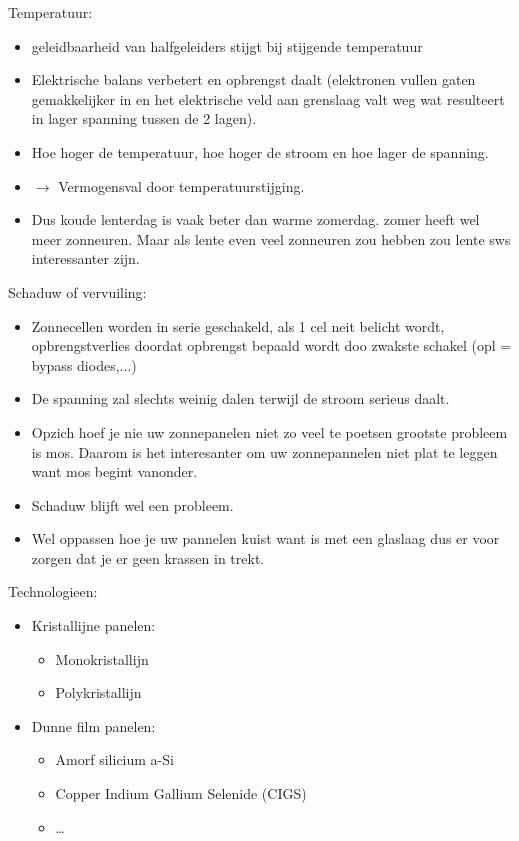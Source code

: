 \documentclass[12pt]{article}
\begin{document}
Temperatuur:\begin{itemize}
    \item geleidbaarheid van halfgeleiders stijgt bij stijgende temperatuur 
    \item Elektrische balans verbetert en opbrengst daalt (elektronen vullen gaten gemakkelijker in en het elektrische veld aan grenslaag valt weg wat resulteert in lager spanning tussen de 2 lagen).
    \item Hoe hoger de temperatuur, hoe hoger de stroom en hoe lager de spanning.
    \item $\rightarrow$ Vermogensval door temperatuurstijging.
    \item Dus koude lenterdag is vaak beter dan warme zomerdag. zomer heeft wel meer zonneuren. Maar als lente even veel zonneuren zou hebben zou lente sws interessanter zijn.
\end{itemize}
Schaduw of vervuiling:\begin{itemize}
    \item Zonnecellen worden in serie geschakeld, als 1 cel neit belicht wordt, opbrengstverlies doordat opbrengst bepaald wordt doo zwakste schakel (opl = bypass diodes,...)
    \item De spanning zal slechts weinig dalen terwijl de stroom serieus daalt.
    \item Opzich hoef je nie uw zonnepanelen niet zo veel te poetsen grootste probleem is mos. Daarom is het interesanter om uw zonnepannelen niet plat te leggen want mos begint vanonder.
    \item Schaduw blijft wel een probleem.
    \item Wel oppassen hoe je uw pannelen kuist want is met een glaslaag dus er voor zorgen dat je er geen krassen in trekt.
\end{itemize}
Technologieen:\begin{itemize}
    \item Kristallijne panelen:\begin{itemize}
        \item Monokristallijn 
        \item Polykristallijn
    \end{itemize}
    \item Dunne film panelen:\begin{itemize}
        \item Amorf silicium {a-Si}
        \item Copper Indium Gallium Selenide
        (CIGS)
        \item \dots 
    \end{itemize}
\end{itemize}
\end{document}
